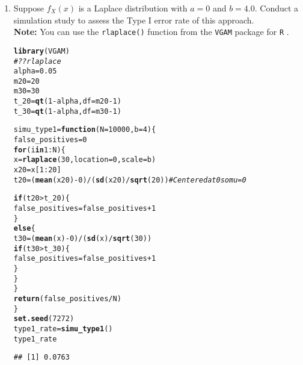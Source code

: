 \documentclass{article}\usepackage[]{graphicx}\usepackage[]{xcolor}
\makeatletter
\newcommand{\hlnum}[1]{\textcolor[rgb]{0.686,0.059,0.569}{#1}}%
\newcommand{\hlcom}[1]{\textcolor[rgb]{0.678,0.584,0.686}{\textit{#1}}}%
\newcommand{\hlopt}[1]{\textcolor[rgb]{0,0,0}{#1}}%
\newcommand{\hldef}[1]{\textcolor[rgb]{0.345,0.345,0.345}{#1}}%
\newcommand{\hlkwa}[1]{\textcolor[rgb]{0.161,0.373,0.58}{\textbf{#1}}}%
\newcommand{\hlkwb}[1]{\textcolor[rgb]{0.69,0.353,0.396}{#1}}%
\newcommand{\hlkwc}[1]{\textcolor[rgb]{0.333,0.667,0.333}{#1}}%
\newcommand{\hlkwd}[1]{\textcolor[rgb]{0.737,0.353,0.396}{\textbf{#1}}}%
\newenvironment{kframe}{%
 \def\at@end@of@kframe{}%
 \ifinner\ifhmode%
  \def\at@end@of@kframe{\end{minipage}}%
  \begin{minipage}{\columnwidth}%
 \fi\fi%
 \def\FrameCommand##1{\hskip\@totalleftmargin \hskip-\fboxsep
 \colorbox{shadecolor}{##1}\hskip-\fboxsep
     \hskip-\linewidth \hskip-\@totalleftmargin \hskip\columnwidth}%
 \MakeFramed {\advance\hsize-\width
   \@totalleftmargin\z@ \linewidth\hsize
   \@setminipage}}%
 {\par\unskip\endMakeFramed%
 \at@end@of@kframe}
\newenvironment{knitrout}{}{} %
\makeatother
\begin{document}
\begin{enumerate}
\begin{enumerate}
  \item Suppose $f_X(x)$ is a Laplace distribution with $a=0$ and $b=4.0$.
  Conduct a simulation study to assess the Type I error rate of this approach.\\
  \textbf{Note:} You can use the \texttt{rlaplace()} function from the \texttt{VGAM}
  package for \texttt{R} \citep{VGAM}.
\begin{knitrout}
\color{fgcolor}\begin{kframe}
\begin{alltt}
\hlkwd{library}\hldef{(VGAM)}
\hlcom{#??rlaplace}
\hldef{alpha} \hlkwb{=} \hlnum{0.05}
\hldef{m20} \hlkwb{=} \hlnum{20}
\hldef{m30} \hlkwb{=} \hlnum{30}
\hldef{t_20} \hlkwb{=} \hlkwd{qt}\hldef{(}\hlnum{1}\hlopt{-}\hldef{alpha,} \hlkwc{df} \hldef{= m20}\hlopt{-}\hlnum{1}\hldef{)}
\hldef{t_30} \hlkwb{=} \hlkwd{qt}\hldef{(}\hlnum{1}\hlopt{-}\hldef{alpha,} \hlkwc{df} \hldef{= m30}\hlopt{-}\hlnum{1}\hldef{)}

\hldef{simu_type1} \hlkwb{=} \hlkwa{function}\hldef{(}\hlkwc{N} \hldef{=} \hlnum{10000}\hldef{,} \hlkwc{b} \hldef{=} \hlnum{4}\hldef{)\{}
  \hldef{false_positives} \hlkwb{=} \hlnum{0}
  \hlkwa{for} \hldef{(i} \hlkwa{in} \hlnum{1}\hlopt{:}\hldef{N)\{}
    \hldef{x} \hlkwb{=} \hlkwd{rlaplace}\hldef{(}\hlnum{30}\hldef{,} \hlkwc{location} \hldef{=} \hlnum{0}\hldef{,} \hlkwc{scale} \hldef{= b)}
    \hldef{x20} \hlkwb{=} \hldef{x[}\hlnum{1}\hlopt{:}\hlnum{20}\hldef{]}
    \hldef{t20} \hlkwb{=} \hldef{(}\hlkwd{mean}\hldef{(x20)} \hlopt{-} \hlnum{0}\hldef{)} \hlopt{/} \hldef{(}\hlkwd{sd}\hldef{(x20)}\hlopt{/}\hlkwd{sqrt}\hldef{(}\hlnum{20}\hldef{))} \hlcom{# Centered at 0 so mu = 0}

    \hlkwa{if} \hldef{(t20} \hlopt{>} \hldef{t_20)\{}
      \hldef{false_positives} \hlkwb{=} \hldef{false_positives} \hlopt{+} \hlnum{1}
    \hldef{\}}
    \hlkwa{else} \hldef{\{}
      \hldef{t30} \hlkwb{=} \hldef{(}\hlkwd{mean}\hldef{(x)} \hlopt{-} \hlnum{0}\hldef{)} \hlopt{/} \hldef{(}\hlkwd{sd}\hldef{(x)}\hlopt{/}\hlkwd{sqrt}\hldef{(}\hlnum{30}\hldef{))}
      \hlkwa{if} \hldef{(t30} \hlopt{>} \hldef{t_30)\{}
        \hldef{false_positives} \hlkwb{=} \hldef{false_positives} \hlopt{+} \hlnum{1}
      \hldef{\}}
    \hldef{\}}
  \hldef{\}}
  \hlkwd{return}\hldef{(false_positives} \hlopt{/} \hldef{N)}
\hldef{\}}
\hlkwd{set.seed}\hldef{(}\hlnum{7272}\hldef{)}
\hldef{type1_rate} \hlkwb{=} \hlkwd{simu_type1}\hldef{()}
\hldef{type1_rate}
\end{alltt}
\begin{verbatim}
## [1] 0.0763
\end{verbatim}
\end{kframe}
\end{knitrout}
  

\end{enumerate}
\end{enumerate}
\end{document}
